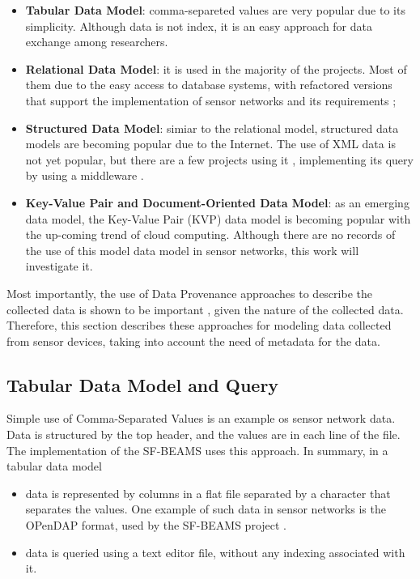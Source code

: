 \begin{itemize}
  \item \textbf{Tabular Data Model}: comma-separeted values are very popular
  due to its simplicity. Although data is not index, it is an easy approach for data
 exchange among researchers.
  \item \textbf{Relational Data Model}: it is used in the majority of the
  projects. Most of them due to the easy access to database systems, with
  refactored versions that support the implementation of sensor networks and
  its requirements \cite{sn-db-tinydb};
  \item \textbf{Structured Data Model}: simiar to the relational model,
  structured data models are becoming popular due to the Internet. The use of
  XML data \cite{xml} is not yet popular, but there are a few projects using it
  \cite{sn-xml-usage01}\cite{sn-xml-usage01}, implementing its query by using a
  middleware \cite{sn-xml-middleware} \cite{sn-xml-query-engines}.
  \item \textbf{Key-Value Pair and Document-Oriented Data Model}: as
  an emerging data model, the Key-Value Pair (KVP) \cite{db-kvp} data model is
  becoming popular with the up-coming trend of cloud computing. Although there are no
  records of the use of this model data model in sensor networks, this work
  will investigate it.
\end{itemize}

Most importantly, the use of Data Provenance approaches to describe the
collected data is shown to be important \cite{sn-provenance}, given the nature
of the collected data. Therefore, this section describes these approaches for
modeling data collected from sensor devices, taking into account the need of
metadata for the data.

\subsection{Tabular Data Model and Query}

Simple use of Comma-Separated Values is an example os sensor network data. Data
is structured by the top header, and the values are in each line of the file.
The implementation of the SF-BEAMS \cite{sfbeams2006} uses this approach. In
summary, in a tabular data model

\begin{itemize}
  \item data is represented by columns in a flat file separated by a character
  that separates the values. One example of such data in sensor networks is the
  OPenDAP \cite{opendap} format, used by the SF-BEAMS project
  \cite{sfbeams2006}.
  \item data is queried using a text editor file, without any indexing
  associated with it. 
\end{itemize}

